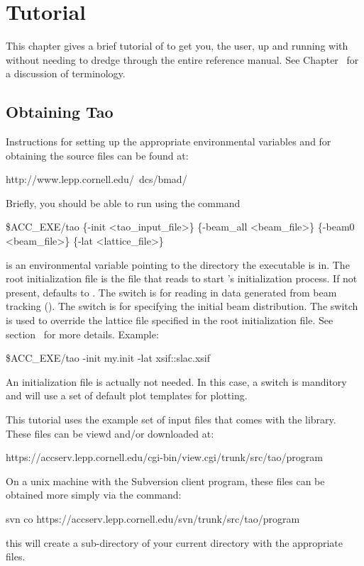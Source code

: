 \chapter{Tutorial}
\label{c:tutorial}

This chapter gives a brief tutorial of \tao to get you, the user, up
and running with \tao without needing to dredge through the entire
reference manual. See Chapter~ for a discussion of
\tao terminology.

\section{Obtaining Tao}
\label{s:obtaining}

Instructions for setting up the appropriate environmental variables
and for obtaining the source files can be found at:
\begin{example}
  http://www.lepp.cornell.edu/~dcs/bmad/
\end{example}

Briefly, you should be able to run \tao using the command
\begin{example}
  \$ACC_EXE/tao \{-init <tao_input_file>\} \{-beam_all <beam_file>\} 
                                  \{-beam0 <beam_file>\} \{-lat <lattice_file>\}
\end{example}
 is an environmental variable pointing to the directory
the \tao executable is in.  The root initialization file
 is the file that \tao reads to start \tao's
initialization process. If not present,  defaults
to . The  switch is for reading in data
generated from beam tracking (). The 
switch is for specifying the initial beam distribution.  The
 switch is used to override the lattice file specified in
the root initialization file. See section~ for
more details. Example:
\begin{example}
  \$ACC_EXE/tao -init my.init -lat xsif::slac.xsif
\end{example}
An initialization file is actually not needed. In this case, a
 switch is manditory and \tao will use a set of default plot
templates for plotting.

This tutorial uses the example set of input files that comes with the \tao library.
These files can be viewd and/or downloaded at:
\begin{example}
  https://accserv.lepp.cornell.edu/cgi-bin/view.cgi/trunk/src/tao/program
\end{example}
On a unix machine with the Subversion  client program, 
these files can be obtained more simply via the command:
\begin{example}
  svn co https://accserv.lepp.cornell.edu/svn/trunk/src/tao/program
\end{example}
this will create a sub-directory  of your current directory with 
the appropriate files.


